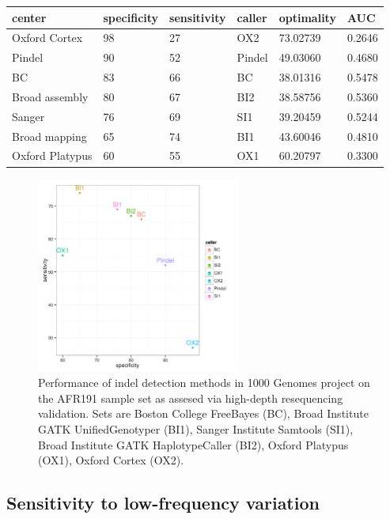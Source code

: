 \documentclass{article}
\begin{document}
\begin{table}
\centering
\begin{tabular}{|l||l|l|l|l|l|}
\hline
center           & specificity & sensitivity & caller & optimality &  AUC   \\
\hline
Oxford Cortex    & 98          & 27          & OX2    & 73.02739   & 0.2646 \\
Pindel           & 90          & 52          & Pindel & 49.03060   & 0.4680 \\
BC               & 83          & 66          & BC     & 38.01316   & 0.5478 \\
Broad assembly   & 80          & 67          & BI2    & 38.58756   & 0.5360 \\
Sanger           & 76          & 69          & SI1    & 39.20459   & 0.5244 \\
Broad mapping    & 65          & 74          & BI1    & 43.60046   & 0.4810 \\
Oxford Platypus  & 60          & 55          & OX1    & 60.20797   & 0.3300 \\ \hline
\end{tabular}
\end{table}


\begin{figure}[h!]
\centering
\includegraphics[width=0.6\textwidth]{miseq}
\caption{Performance of indel detection methods in 1000 Genomes project on the AFR191 sample set as assesed via high-depth resequencing validation.  Sets are Boston College FreeBayes (BC), Broad Institute GATK UnifiedGenotyper (BI1), Sanger Institute Samtools (SI1), Broad Institute GATK HaplotypeCaller (BI2), Oxford Platypus (OX1), Oxford Cortex (OX2).}
\label{fig:1000Gindels}
\end{figure}

\subsection{Sensitivity to low-frequency variation}
\label{sec:lowfreq}
\end{document}
